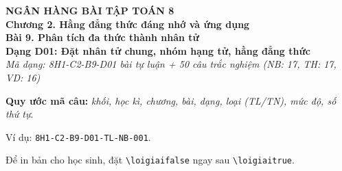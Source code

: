 \documentclass[12pt,a4paper]{article}
\newif\ifloigiai
\begin{document}
\begin{center}
{\Large\textbf{NGÂN HÀNG BÀI TẬP TOÁN 8}}\\[3pt]
\textbf{Chương 2. Hằng đẳng thức đáng nhớ và ứng dụng}\\[2pt]
\textbf{Bài 9. Phân tích đa thức thành nhân tử}\\[2pt]
\textbf{Dạng D01: Đặt nhân tử chung, nhóm hạng tử, hằng đẳng thức}\\[2pt]
\textit{Mã dạng: 8H1-C2-B9-D01  bài tự luận + 50 câu trắc nghiệm \quad (NB: 17, TH: 17, VD: 16)}
\end{center}
\textbf{Quy ước mã câu:} \textit{khối, học kì, chương, bài, dạng, loại (TL/TN), mức độ, số thứ tự}.\par Ví dụ: \texttt{8H1-C2-B9-D01-TL-NB-001}.\par Để in bản cho học sinh, đặt \verb|\loigiaifalse| ngay sau \verb|\loigiaitrue|.
\end{document}
